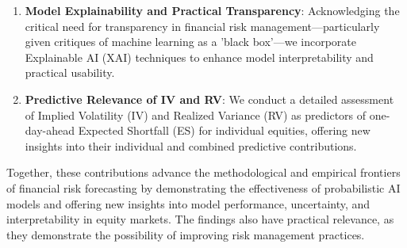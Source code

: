 \begin{enumerate}
    \item \textbf{Model Explainability and Practical Transparency}: Acknowledging the critical need for transparency in financial risk management—particularly given critiques of machine learning as a 'black box'—we incorporate Explainable AI (XAI) techniques to enhance model interpretability and practical usability.
    \item \textbf{Predictive Relevance of IV and RV}: We conduct a detailed assessment of Implied Volatility (IV) and Realized Variance (RV) as predictors of one-day-ahead Expected Shortfall (ES) for individual equities, offering new insights into their individual and combined predictive contributions.
\end{enumerate}

Together, these contributions advance the methodological and empirical frontiers of financial risk forecasting by demonstrating the effectiveness of probabilistic AI models and offering new insights into model performance, uncertainty, and interpretability in equity markets. The findings also have practical relevance, as they demonstrate the possibility of improving risk management practices.


